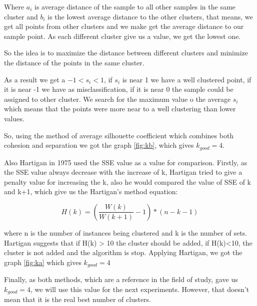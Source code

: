 \documentclass[a4paper,11pt]{article}
\begin{document}
Where $a_i$ is  average distance of the  sample to all other samples  in the same
cluster and  $b_i$ is the  lowest average distance to the other
clusters, that means, we get all points from other clusters and we make get the
average distance to our sample point. As each different cluster give us a value,
we get the lowest one.

So the idea is to maximize the distance between different clusters and minimize the distance
of the points in the same cluster.

As a result we get a $-1 < s_i < 1$, if $s_i$ is near 1 we have a well clustered
point, if it is near -1 we have as misclassification, if it is near 0 the sample
could be assigned to other cluster. We search for the maximum value o the average
$s_i$ which means  that the points were more near to  a well clustering than
lower values.

So, using the method of average silhouette coefficient which combines both 
cohesion and separation we got the graph \ref{fig:kb}, which gives $k_{good} = 4$.



Also Hartigan in 1975 used the SSE value as a value for comparison. Firstly, as
the SSE value always  decrease with the increase of k, Hartigan  tried to give a
penalty value for increasing the k, also he would compared the value of SSE of k
and k+1, which give us the Hartigan's method equation:

\begin{equation*}
H(k) = \left ( \frac{W(k)}{W(k+1)}-1  \right )*(n-k-1)
\end{equation*}

where  n is  the number  of instances  being clustered  and k  is the  number of
sets. Hartigan suggests that if H(k) > 10 the cluster should be added, if H(k)<10,
the cluster  is not added and the  algorithm is stop. Applying  Hartigan, we got
the graph \ref{fig:ka} which gives $k_{good} = 4$

Finally, as both methods, which are a reference in the field of study, gave us $k_{good} = 4$, we will use this value for the next experiments. 
However, that doesn't mean that it is the real best number of clusters.
\end{document}
